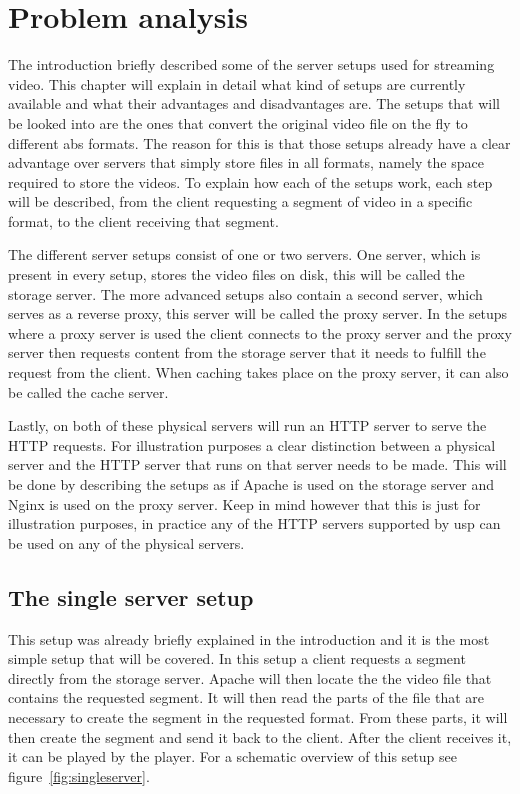 \documentclass[twoside,openright]{uva-bachelor-thesis}
\begin{document}
\chapter{Problem analysis}\label{ch:problem}
The introduction briefly described some of the server setups used for streaming
video. This chapter will explain in detail what kind of setups are currently
available and what their advantages and disadvantages are. The setups that will
be looked into are the ones that convert the original video file on the fly to
different \gls{abs} formats. The reason for this is that those setups already
have a clear advantage over servers that simply store files in all formats,
namely the space required to store the videos. To explain how each of the setups
work, each step will be described, from the client requesting a segment of video
in a specific format, to the client receiving that segment.

The different server setups consist of one or two servers. One server, which is
present in every setup, stores the video files on disk, this will be called the
storage server. The more advanced setups also contain a second server, which
serves as a reverse proxy, this server will be called the proxy server. In the
setups where a proxy server is used the client connects to the proxy server and
the proxy server then requests content from the storage server that it needs to
fulfill the request from the client. When caching takes place on the proxy
server, it can also be called the cache server.

Lastly, on both of these physical servers will run an HTTP server to serve the
HTTP requests. For illustration purposes a clear distinction between a
physical server and the HTTP server that runs on that server needs to be made.
This will be done by describing the setups as if Apache is used on the storage
server and Nginx is used on the proxy server. Keep in mind however that this is
just for illustration purposes, in practice any of the HTTP servers supported by
\gls{usp} can be used on any of the physical servers.


\section{The single server setup}
This setup was already briefly explained in the introduction and it is the most
simple setup that will be covered. In this setup a client requests a segment
directly from the storage server. Apache will then locate the the video file
that contains the requested segment. It will then read the parts of the file
that are necessary to create the segment in the requested format. From these
parts, it will then create the segment and send it back to the client. After the
client receives it, it can be played by the player. For a schematic overview of
this setup see figure~\vref{fig:singleserver}.
\end{document}
